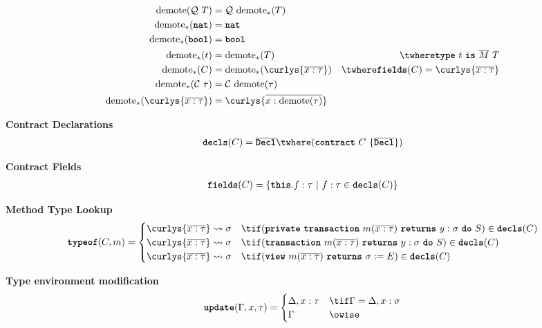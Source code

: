 \documentclass[dvipsnames, usenames, sigconf]{acmart}
\begin{document}
\begin{align*}
    \demote(\mathcal{Q}~T) &= \mathcal{Q}~\demote_*(T) \\
    \demote_*(\natt) &= \natt \\
    \demote_*(\boolt) &= \boolt \\
    \demote_*(t) &= \demote_*(T) & \twhere \type~t~\is~\overline{M}~T \\
    \demote_*(C) &= \demote_*(\curlys{\overline{x : \tau}}) & \twhere \fields(C) = \curlys{\overline{x : \tau}} \\
    \demote_*(\mathcal{C}~\tau) &= \mathcal{C}~\demote(\tau) \\
    \demote_*(\curlys{\overline{x : \tau}}) &= \curlys{\overline{x : \demote(\tau)}} \\
\end{align*}

 \textbf{Contract Declarations}
\begin{align*}
    \decls(C) = \overline{\Decl} \twhere (\contract~C~\{ \overline{\Decl} \})
\end{align*}

 \textbf{Contract Fields}
\begin{align*}
    \textbf{\texttt{fields}}(C) = \left\{ {\textbf{\texttt{this}}.f : \tau} ~|~ {f : \tau \in \textbf{\texttt{decls}}(C)} \right\}
\end{align*}

 \textbf{Method Type Lookup}
\begin{align*}
    \typeof(C, m) =
    \begin{cases}
        \curlys{\overline{x : \tau}} \transforms \sigma & \tif (\private~\transaction~m(\overline{x : \tau})~\returns~y:\sigma~\doC~S) \in \decls(C) \\
        \curlys{\overline{x : \tau}} \transforms \sigma & \tif (\transaction~m(\overline{x : \tau})~\returns~y:\sigma~\doC~S) \in \decls(C) \\
        \curlys{\overline{x : \tau}} \transforms \sigma & \tif (\view~m(\overline{x : \tau})~\returns~\sigma := E) \in \decls(C)
    \end{cases}
\end{align*}

 \textbf{Type environment modification}
\[
    \update(\Gamma, x, \tau) =
    \begin{cases}
        \Delta, x : \tau & \tif \Gamma = \Delta, x : \sigma \\
        \Gamma & \owise
    \end{cases}
\]
\end{document}
